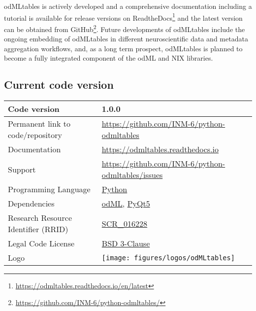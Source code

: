 {odMLtables is actively developed and a comprehensive documentation including a tutorial is available for release versions on ReadtheDocs\footnote{\url{https://odmltables.readthedocs.io/en/latest}} and the latest version can be obtained from GitHub\footnote{\url{https://github.com/INM-6/python-odmltables/}}. Future developments of odMLtables include the ongoing embedding of odMLtables in different neuroscientific data and metadata aggregation workflows, and, as a long term prospect, odMLtables is planned to become a fully integrated component of the odML and NIX libraries.


\subsection{Current code version}
\label{sec:code_version}

\begin{tabular}{ll}
\hline
Code version & 1.0.0 \\
\hline
Permanent link to code/repository & \href{https://github.com/INM-6/python-odmltables}{https://github.com/INM-6/python-odmltables}\\
\hline
Documentation & \href{https://odmltables.readthedocs.io}{https://odmltables.readthedocs.io}\\
\hline
Support & \href{https://github.com/INM-6/python-odmltables/issues}{https://github.com/INM-6/python-odmltables/issues}\\
\hline
Programming Language & \href{https://www.python.org/}{Python}\\
\hline
Dependencies & \href{http://g-node.github.io/python-odml/}{odML}, \href{https://wiki.python.org/moin/PyQt}{PyQt5}\\  
\hline
Research Resource Identifier (RRID) & \href{https://scicrunch.org/scicrunch/Resources/record/nlx_144509-1/SCR_016228/resolver}{SCR\_016228}\\
\hline
Legal Code License  & \href{https://github.com/INM-6/python-odmltables/blob/master/LICENSE.txt}{BSD 3-Clause} \\
\hline
Logo &
\texttt{[image: figures/logos/odMLtables]}\\
\hline
\end{tabular}
}

